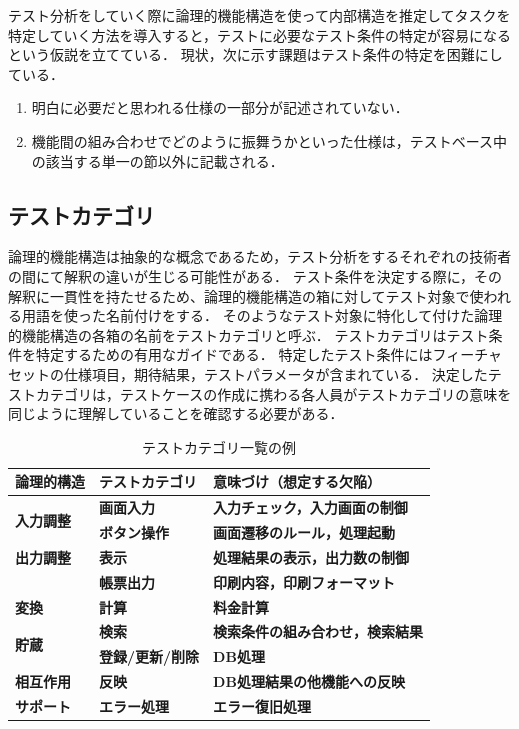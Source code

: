 テスト分析をしていく際に論理的機能構造を使って内部構造を推定してタスクを特定していく方法を導入すると，テストに必要なテスト条件の特定が容易になるという仮説を立てている．
現状，次に示す課題はテスト条件の特定を困難にしている．

\begin{enumerate}
\item 明白に必要だと思われる仕様の一部分が記述されていない．
\item 機能間の組み合わせでどのように振舞うかといった仕様は，テストベース中の該当する単一の節以外に記載される．
\end{enumerate}

\subsection{テストカテゴリ}
論理的機能構造は抽象的な概念であるため，テスト分析をするそれぞれの技術者の間にて解釈の違いが生じる可能性がある．
テスト条件を決定する際に，その解釈に一貫性を持たせるため、論理的機能構造の箱に対してテスト対象で使われる用語を使った名前付けをする．
そのようなテスト対象に特化して付けた論理的機能構造の各箱の名前をテストカテゴリと呼ぶ．
テストカテゴリはテスト条件を特定するための有用なガイドである．
特定したテスト条件にはフィーチャセットの仕様項目，期待結果，テストパラメータが含まれている．
決定したテストカテゴリは，テストケースの作成に携わる各人員がテストカテゴリの意味を同じように理解していることを確認する必要がある．

\begin{table}[htbp]
  \centering
  \caption{テストカテゴリ一覧の例}
    \begin{tabular}{|p{6em}|p{8.07em}|p{14.645em}|}
    \hline
    \textbf{論理的構造} & \textbf{テストカテゴリ} & \textbf{意味づけ（想定する欠陥）} \bigstrut\\
    \hline
    \multirow{2}[4]{*}{\textbf{入力調整}} & \textbf{画面入力} & \textbf{入力チェック，入力画面の制御} \bigstrut\\
\cline{2-3}    \multicolumn{1}{|l|}{} & \textbf{ボタン操作} & \textbf{画面遷移のルール，処理起動} \bigstrut\\
    \hline
    \textbf{出力調整} & \textbf{表示} & \textbf{処理結果の表示，出力数の制御} \bigstrut\\
    \hline
    \multicolumn{1}{|r|}{} & \textbf{帳票出力} & \textbf{印刷内容，印刷フォーマット} \bigstrut\\
    \hline
    \textbf{変換} & \textbf{計算} & \textbf{料金計算} \bigstrut\\
    \hline
    \multirow{2}[4]{*}{\textbf{貯蔵}} & \textbf{検索} & \textbf{検索条件の組み合わせ，検索結果} \bigstrut\\
\cline{2-3}    \multicolumn{1}{|l|}{} & \textbf{登録/更新/削除} & \textbf{DB処理} \bigstrut\\
    \hline
    \textbf{相互作用} & \textbf{反映} & \textbf{DB処理結果の他機能への反映} \bigstrut\\
    \hline
    \textbf{サポート} & \textbf{エラー処理} & \textbf{エラー復旧処理} \bigstrut\\
    \hline
    \end{tabular}%
  \label{tbl:D-4-tbl1}%
\end{table}

